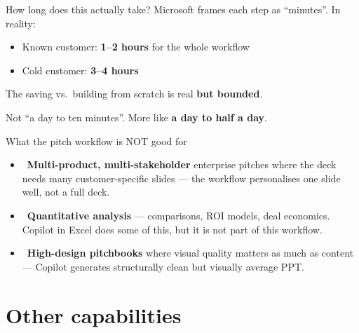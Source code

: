 \documentclass[11pt,aspectratio=169]{beamer}
\newcommand{\bad}{\textcolor{warningred}{\textbf{\texttimes}}}
\newcommand{\hl}[1]{\textbf{\textcolor{accentteal}{#1}}}
\begin{document}
\begin{frame}{How long does this actually take?}
  Microsoft frames each step as ``minutes''. In reality:

  \medskip
  \begin{itemize}
    \item Known customer: \hl{1--2 hours} for the whole workflow
    \item Cold customer: \hl{3--4 hours}
  \end{itemize}

  \vfill
  The saving vs.\ building from scratch is real \textbf{but bounded}.

  \medskip
  Not ``a day to ten minutes''. More like \hl{a day to half a day}.
\end{frame}

\begin{frame}{What the pitch workflow is NOT good for}
  \begin{itemize}
    \item \bad\ \textbf{Multi-product, multi-stakeholder} enterprise pitches where the deck needs many customer-specific slides --- the workflow personalises one slide well, not a full deck.
    \item \bad\ \textbf{Quantitative analysis} --- comparisons, ROI models, deal economics. Copilot in Excel does some of this, but it is not part of this workflow.
    \item \bad\ \textbf{High-design pitchbooks} where visual quality matters as much as content --- Copilot generates structurally clean but visually average PPT.
  \end{itemize}
\end{frame}

\section{Other capabilities}
\end{document}
